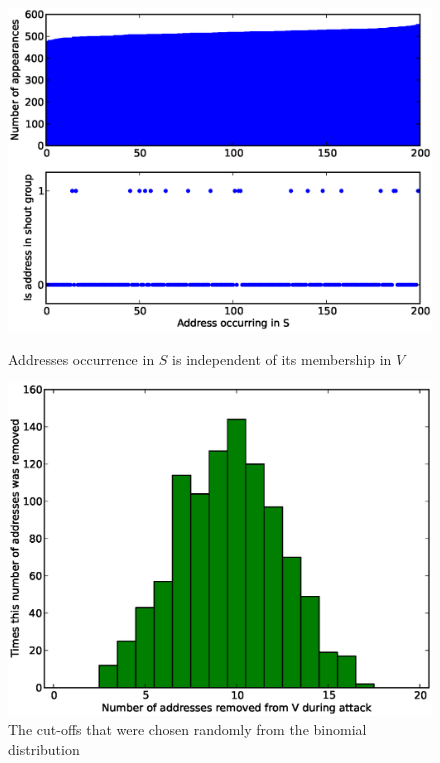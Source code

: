 \documentclass[ %
                    author={Luke Murray},
                supervisor={Dr. Simon Hollis},
                     title={Shadow Peer-to-Peer Networks},
                  subtitle={},
                    degree={MEng},
                      year={2013} ]{thesis}
\begin{document}
\begin{figure}[h]
    \centering
    \begin{minipage}[b]{0.45\linewidth}
        \centering
        \includegraphics[width=\linewidth]{diagrams/desired1.eps}
        \caption{Addresses occurrence in $S$ is independent of its membership in $V$}
        \label{threshold_attack_desired1}
    \end{minipage}
    \hspace{0.5cm}
    \begin{minipage}[b]{0.45\linewidth}
        \centering
        \includegraphics[width=\linewidth]{diagrams/desired2.eps}
        \caption{The cut-offs that were chosen randomly from the binomial distribution}
        \label{threshold_attack_desired2}
    \end{minipage}
\end{figure}
\end{document}
